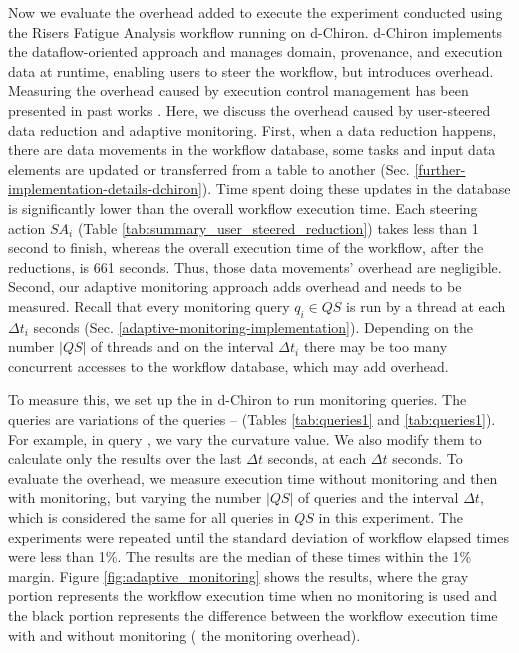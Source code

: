 Now we evaluate the overhead added to execute the experiment conducted using
the Risers Fatigue Analysis workflow running on d-Chiron. d-Chiron implements the
 dataflow-oriented approach and manages domain, provenance,
and execution data at runtime, enabling
users to steer the workflow, but introduces overhead. Measuring the overhead caused by execution control management has been presented in past works 
\cite{souza_controlling_2015_thesis,Souza2015Parallel,Souza2015Monitoramento}.
Here, we discuss the overhead caused by user-steered data reduction and adaptive monitoring. First, when a data
reduction happens, there are data movements in the workflow database,
\ie{} some tasks and input data elements are updated or
transferred from a table to another (Sec. \ref{further-implementation-details-dchiron}).
Time spent doing
these updates in the database is significantly lower than the overall
workflow execution time. Each steering action $SA_i$
(Table \ref{tab:summary_user_steered_reduction}) takes less than 1 second to finish, whereas
the overall execution time of the workflow, after the reductions, is 661 seconds.
Thus, those data movements' overhead are negligible.
Second,
our adaptive monitoring approach adds overhead and needs to be measured.
Recall that every monitoring query $q_i \in QS$ is
run by a thread at each $\Delta t_i$ seconds (Sec. \ref{adaptive-monitoring-implementation}).
Depending on the number $|QS|$  of
threads and on the interval $\Delta t_i$ there may be too
many concurrent accesses to the workflow database, 
which may add overhead.

To measure this, we set up the  in d-Chiron to run monitoring queries. 
The queries are variations of 
the queries -- (Tables \ref{tab:queries1} and \ref{tab:queries1}).
For example, in query , we vary the curvature value.
We also modify them to
calculate only the results over the last $\Delta t$ seconds, at each $\Delta t$
seconds. To evaluate the overhead, we measure execution time without
monitoring and then with monitoring, but varying the number $|QS|$ of queries
 and the interval $\Delta t$, which is considered the same for
all queries in $QS$ in this experiment.
The experiments were
repeated until the standard deviation of workflow elapsed times were less
than 1\%. The results are the median of these times within the 1\%
margin. Figure \ref{fig:adaptive_monitoring} shows the results, where the gray portion represents
the workflow execution time when no monitoring is used and the black
portion represents the difference between the workflow execution time
with and without monitoring (\ie{} the monitoring overhead).



